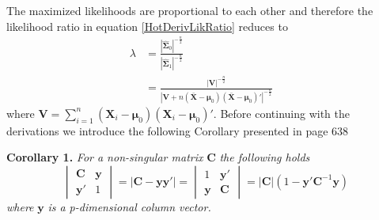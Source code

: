The maximized likelihoods are proportional to each other and therefore the likelihood ratio in equation \eqref{HotDerivLikRatio} reduces to 
\begin{align}
\lambda&=\frac{|\widehat{\boldsymbol{\Sigma}}_0|^{-\frac{n}{2}}}{|\widehat{\boldsymbol{\Sigma}}_1|^{-\frac{n}{2}}}& \nonumber \\
&=\frac{|\mathbf{V}|^{-\frac{n}{2}}}{|\mathbf{V}+n(\bar{\mathbf{X}}-\boldsymbol{\mu}_0)(\bar{\mathbf{X}}-\boldsymbol{\mu}_0)'|^{-\frac{n}{2}}}& \label{HotDerivLikRatioREDUCED}
\end{align}
where $\mathbf{V}=\sum_{i=1}^{n}(\mathbf{X}_i-\boldsymbol{\mu}_0)(\mathbf{X}_i-\boldsymbol{\mu}_0)'$. Before continuing with the derivations we introduce the following Corollary presented in \citet{MultStatAnalysis} page 638

\textbf{Corollary 1.} \textit{For a non-singular matrix }$\mathbf{C}$ \textit{the following holds}
$$
\begin{vmatrix}
\mathbf{C} & \mathbf{y} \\
\mathbf{y}' & 1
\end{vmatrix} = |\mathbf{C}-\mathbf{y}\mathbf{y}'|=
\begin{vmatrix}
1 & \mathbf{y}' \\
\mathbf{y} & \mathbf{C} 
\end{vmatrix} = |\mathbf{C}|(1-\mathbf{y}'\mathbf{C}^{-1}\mathbf{y})
$$
\textit{where }$\mathbf{y}$\textit{ is a p-dimensional column vector.}

